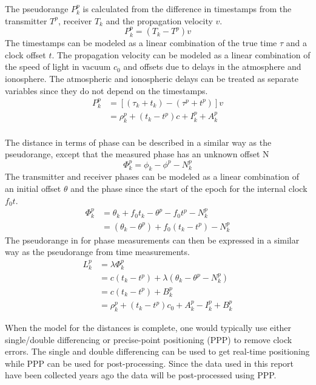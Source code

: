 \documentclass[12pt,a4paper]{article}
\begin{document}
\noindent The pseudorange $P_k^p$ is calculated from the difference in timestamps from the transmitter $T^p$, receiver $T_k$ and the propagation velocity $v$.
\begin{equation}
  \label{eq:pseudorange}
  P_k^p=(T_k-T^p)v
\end{equation}
The timestamps can be modeled as a linear combination of the true time $\tau$ and a clock offset $t$.
The propagation velocity can be modeled as a linear combination of the speed of light in vacuum $c_0$ and offsets due to delays in the atmosphere and ionosphere.
The atmospheric and ionospheric delays can be treated as separate variables since they do not depend on the timestamps.
\begin{align}
  \label{eq:code_len}
  P_k^p & = [(\tau_k+t_k)-(\tau^p+t^p)]v \nonumber \\
        & = \rho_k^p + (t_k-t^p)c + I_k^p + A_k^p
\end{align}\\

\noindent The distance in terms of phase can be described in a similar way as the pseudorange, except that the measured phase has an unknown offset N
\begin{equation}
  \label{eq:phaserange}
  \Phi_k^p=\phi_k-\phi^p-N_k^p
\end{equation}
The transmitter and receiver phases can be modeled as a linear combination of an initial offset $\theta$ and the phase since the start of the epoch for the internal clock $f_0t$.
\begin{align}
  \Phi_k^p & = \theta_k+f_0t_k - \theta^p-f_0t^p-N_k^p \nonumber \\
           & = (\theta_k-\theta^p) + f_0(t_k-t^p) - N_k^p
\end{align}
The pseudorange in for phase measurements can then be expressed in a similar way as the pseudorange from time measurements.
\begin{align}
  \label{eq:phase_len}
  L_k^p & = \lambda\Phi_k^p \nonumber \\
        & = c(t_k-t^p) + \lambda(\theta_k-\theta^p - N_k^p) \nonumber \\
        & = c(t_k-t^p) + B_k^p \nonumber \\
        & = \rho_k^p + (t_k-t^p)c_0 + A_k^p - I_k^p + B_k^p
\end{align}

When the model for the distances is complete, one would typically use either single/double differencing or precise-point positioning (PPP) to remove clock errors.
The single and double differencing can be used to get real-time positioning while PPP can be used for post-processing.
Since the data used in this report have been collected years ago the data will be post-processed using PPP.
\end{document}
